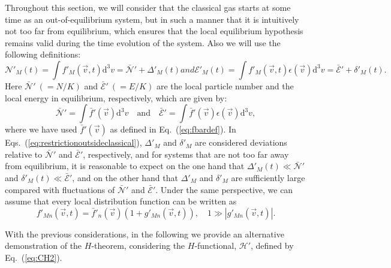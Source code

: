 Throughout this section, we will consider that the classical gas
starts at some time as an out-of-equilibrium system,
but in such a manner that it is intuitively not too far from equilibrium,
which ensures that the local equilibrium hypothesis remains valid during
the time evolution of the system.
Also we will use the following definitions:
\begin{subequations}\label{eq:restrictionoutsideclassical}
%
\begin{equation}
      \mathcal{N}'_M(t)=\int f'_{M}(\vec{v},t) \mathrm{d}^{3}v=
      \bar{\mathcal{N}}'+\Delta'_M(t)
\end{equation}
%
and
%
\begin{equation}
      \mathcal{E}'_M(t)=\int f'_{M}(\vec{v},t) \epsilon(\vec{v}) \mathrm{d}^{3}v=
      \bar{\mathcal{E}}'+ \delta'_M(t).
\end{equation}
\end{subequations}
%
Here $\bar {\mathcal{N}}'\ (=N/K)$ and $\bar{\mathcal{E}}'\ (=E/K)$ are
the local particle number and the local energy in equilibrium, respectively, which are given by:
%
    \begin{equation}
      \bar{\mathcal{N}}'=
      \int \bar{f}'(\vec{v}) \mathrm{d}^{3}v\quad\textrm{and} \quad
      \bar{\mathcal{E}}'=
      \int \bar{f}'(\vec{v})\epsilon(\vec{v}) \mathrm{d}^{3}v,
    \end{equation}
where we have used $\bar{f}'(\vec{v})$ as defined in Eq.~(\ref{eq:fbardef}).
In Eqs.~(\ref{eq:restrictionoutsideclassical}), $\Delta'_M$ and $\delta'_M$
are considered deviations relative to
$\bar{\mathcal{N}}'$ and $\bar{\mathcal{E}}'$, respectively, and for systems that are not
too far away from equilibrium, it is reasonable to expect on the one hand that
$\Delta'_M(t)\ll\bar{\mathcal{N}}'$ and
$\delta'_M(t)\ll\bar{\mathcal{E}}'$, and on the other hand that $\Delta'_M$ and
$\delta'_M$ are sufficiently large compared with fluctuations of $\bar{\mathcal{N}}'$
and $\bar{\mathcal{E}}'$. Under the same perspective, we can assume that every local
distribution function can be written as
\begin{equation}\label{eq:firstorder}
   f'_{Mn}(\vec{v},t)=\bar{f}'_{n}(\vec{v})(1+g'_{Mn}(\vec{v},t)),\quad
   1\gg|g'_{Mn}(\vec{v},t)|.
\end{equation}
%

With the previous considerations, in the following we provide an alternative demonstration
of the $H$-theorem, considering the $H$-functional, $\mathcal{H}'$, defined by Eq.~(\ref{eq:CH2}).

